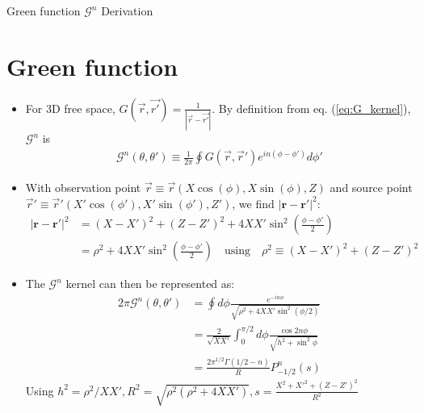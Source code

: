 \documentclass[8pt]{beamer}
\begin{document}
\begin{frame}{\color{white} Green function $\mathcal{G}^n$ Derivation}
\section{Green function}
\begin{itemize}
    \item For 3D free space, $G(\vec{r},\vec{r'}) = \frac{1}{|\vec{r}-\vec{r'}|}$. By definition from eq. (\ref{eq:G_kernel}), $\mathcal{G}^n$ is
    \begin{align}
         \mathcal{G}^n(\theta, \theta') \equiv \frac{1}{2\pi} \oint G(\vec{r}, \vec{r}') e^{in(\phi - \phi')} d\phi'
    \end{align}
    \item With observation point $\vec{r} \equiv \vec{r}(X\cos(\phi),X\sin(\phi), Z)$ and source point $\vec{r}' \equiv \vec{r}'(X'\cos(\phi'),X'\sin(\phi'), Z')$, we find $|\mathbf{r} - \mathbf{r}'|^2$:
    \begin{align}
         |\mathbf{r} - \mathbf{r}'|^2 &= (X - X')^2 + (Z - Z')^2 + 4XX'\sin^2\left(\frac{\phi - \phi'}{2}\right) \nonumber \\
         &= \rho^2 + 4XX'\sin^2\left(\frac{\phi - \phi'}{2}\right) \quad \text{using} \quad \rho^2 \equiv (X - X')^2 + (Z - Z')^2
    \end{align}
    \item The $\mathcal{G}^n$ kernel can then be represented as:
    \begin{align}
         2\pi\mathcal{G}^n(\theta, \theta') &= \oint d\phi \frac{e^{-in\phi}}{\sqrt{\rho^2 + 4XX' \sin^2(\phi/2)}} \label{eq:G_kernel_rho}\\
         &= \frac{2}{\sqrt{XX'}} \int_0^{\pi/2} d\phi \frac{\cos 2n\phi}{\sqrt{h^2 + \sin^2 \phi}} \\
         &= \frac{2\pi^{1/2}\Gamma(1/2-n)}{R} P_{-1/2}^n(s) \label{eq:G_kernel_legendre}
    \end{align}
    Using $h^2 = \rho^2/XX', R^2 = \sqrt{\rho^2(\rho^2+4XX')}, s = \frac{X^2+X'^2+(Z-Z')^2}{R^2} $

\end{itemize}
\end{frame}
\end{document}
